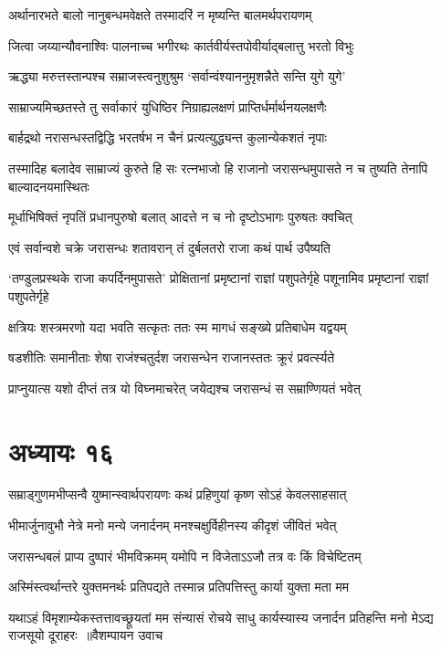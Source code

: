 \twolineshloka
{अर्थानारभते बालो नानुबन्धमवेक्षते}
{तस्मादरिं न मृष्यन्ति बालमर्थपरायणम्}


\twolineshloka
{जित्वा जय्यान्यौवनाश्विः पालनाच्च भगीरथः}
{कार्तवीर्यस्तपोवीर्याद्बलात्तु भरतो विभुः}


\twolineshloka
{ऋद्ध्या मरुत्तस्तान्पश्च सम्राजस्त्वनुशुश्रुम}
{`सर्वान्वंश्याननुमृशन्नैते सन्ति युगे युगे'}


\twolineshloka
{साम्राज्यमिच्छतस्ते तु सर्वाकारं युधिष्ठिर}
{निग्राह्यलक्षणं प्राप्तिर्धर्मार्थनयलक्षणैः}


\twolineshloka
{बार्हद्रथो नरासन्धस्तद्विद्धि भरतर्षभ}
{न चैनं प्रत्यत्युद्ध्यन्त कुलान्येकशतं नृपाः}


तस्मादिह बलादेव साम्राज्यं कुरुते हि सः
\twolineshloka
{रत्नभाजो हि राजानो जरासन्धमुपासते}
{न च तुष्यति तेनापि बाल्यादनयमास्थितः}


\twolineshloka
{मूर्धाभिषिक्तं नृपतिं प्रधानपुरुषो बलात्}
{आदत्ते न च नो दृष्टोऽभागः पुरुषतः क्वचित्}


\twolineshloka
{एवं सर्वान्वशे चक्रे जरासन्धः शतावरान्}
{तं दुर्बलतरो राजा कथं पार्थ उपैष्यति}


\fourlineindentedshloka
{`तण्डुलप्रस्थके राजा कपर्दिनमुपासते'}
{प्रोक्षितानां प्रमृष्टानां राज्ञां पशुपतेर्गृहे}
{पशूनामिव प्रमृष्टानां राज्ञां पशुपतेर्गृहे}
{}


\twolineshloka
{क्षत्रियः शस्त्रमरणो यदा भवति सत्कृतः}
{ततः स्म मागधं सङ्ख्ये प्रतिबाधेम यद्वयम्}


\twolineshloka
{षडशीतिः समानीताः शेषा राजंश्चतुर्दश}
{जरासन्धेन राजानस्ततः क्रूरं प्रवर्त्स्यते}


\twolineshloka
{प्राप्नुयात्स यशो दीप्तं तत्र यो विघ्नमाचरेत्}
{जयेद्यश्च जरासन्धं स सम्राण्णियतं भवेत्}


\chapter{अध्यायः १६}
\twolineshloka
{सम्राड्गुणमभीप्सन्वै युष्मान्स्वार्थपरायणः}
{कथं प्रहिणुयां कृष्ण सोऽहं केवलसाहसात्}


\twolineshloka
{भीमार्जुनावुभौ नेत्रे मनो मन्ये जनार्दनम्}
{मनश्चक्षुर्विहीनस्य कीदृशं जीवितं भवेत्}


\twolineshloka
{जरासन्धबलं प्राप्य दुष्पारं भीमविक्रमम्}
{यमोपि न विजेताऽऽजौ तत्र वः किं विचेष्टितम्}


\twolineshloka
{अस्मिंस्त्वर्थान्तरे युक्तमनर्थः प्रतिपद्यते}
{तस्मान्न प्रतिपत्तिस्तु कार्या युक्ता मता मम}


\threelineshloka
{यथाऽहं विमृशाम्येकस्तत्तावच्छ्रूयतां मम}
{संन्यासं रोचये साधु कार्यस्यास्य जनार्दन}
{प्रतिहन्ति मनो मेऽद्य राजसूयो दूराहरः ॥वैशम्पायन उवाच}


